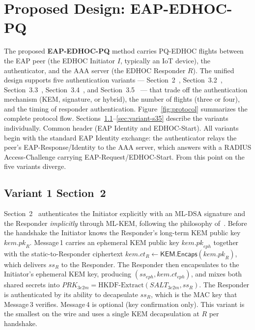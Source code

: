 \documentclass{easychair}
\newcommand{\VarSec}[1]{Section~#1~\cite{pq-edhoc-draft}}
\newcommand{\HKDFextract}{\mathrm{HKDF\text{-}Extract}}
\newcommand{\Encaps}{\mathsf{KEM.Encaps}}
\begin{document}
\section{Proposed Design: EAP-EDHOC-PQ}
\label{proposed-design}
The proposed \textbf{EAP-EDHOC-PQ} method carries PQ-EDHOC flights between
the EAP peer (the EDHOC Initiator $I$, typically an IoT device), the
authenticator, and the AAA server (the EDHOC Responder $R$). The unified
design supports five authentication variants --- \VarSec{2},
\VarSec{3.2}, \VarSec{3.3}, \VarSec{3.4}, and \VarSec{3.5} --- that
trade off the authentication mechanism (KEM, signature, or hybrid),
the number of flights (three or four), and the timing of responder
authentication. Figure~\ref{fig:protocol} summarizes the complete
protocol flow. Sections~\ref{sec:variant-s2}--\ref{sec:variant-s35}
describe the variants individually. Common header (EAP Identity and EDHOC-Start). All variants begin with the standard EAP Identity exchange: the
authenticator relays the peer's EAP-Response/Identity to the AAA server,
which answers with a RADIUS Access-Challenge carrying
EAP-Request/EDHOC-Start. From this point on the five variants diverge.

\subsection{Variant 1 \texorpdfstring{\VarSec{2}}{Section 2 of the draft}}
\label{sec:variant-s2}
\VarSec{2} authenticates the Initiator explicitly with an ML-DSA
signature and the Responder \emph{implicitly} through ML-KEM, following
the philosophy of~\cite{pocero}. Before the handshake the Initiator
knows the Responder's long-term KEM public key $\mathit{kem.pk}_R$.
Message\,1 carries an ephemeral KEM public key
$\mathit{kem.pk}_{\mathit{eph}}$ together with the static-to-Responder
ciphertext $\mathit{kem.ct}_R \leftarrow \Encaps(\mathit{kem.pk}_R)$,
which delivers $\mathit{ss}_R$ to the Responder. The Responder then
encapsulates to the Initiator's ephemeral KEM key, producing
$(\mathit{ss}_{\mathit{eph}},\mathit{kem.ct}_{\mathit{eph}})$, and mixes
both shared secrets into $\mathit{PRK}_{\mathit{3e2m}} =
\HKDFextract(\mathit{SALT}_{\mathit{3e2m}},\mathit{ss}_R)$. The
Responder is authenticated by its ability to decapsulate
$\mathit{ss}_R$, which is the MAC key that Message\,3 verifies.
Message\,4 is optional (key confirmation only). This variant is the
smallest on the wire and uses a single KEM decapsulation at $R$ per
handshake.
\end{document}
